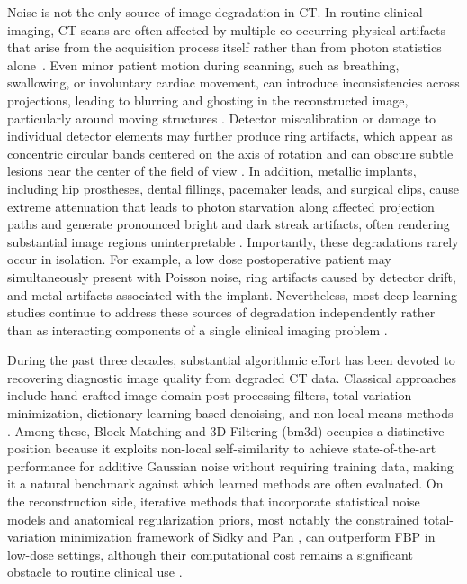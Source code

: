 Noise is not the only source of image degradation in CT. In routine clinical imaging, CT scans are often affected by multiple co-occurring physical artifacts that arise from the acquisition process itself rather than from photon statistics alone~\cite{Boas2012}. Even minor patient motion during scanning, such as breathing, swallowing, or involuntary cardiac movement, can introduce inconsistencies across projections, leading to blurring and ghosting in the reconstructed image, particularly around moving structures \cite{LuMackie2002, Lu2005}. Detector miscalibration or damage to individual detector elements may further produce ring artifacts, which appear as concentric circular bands centered on the axis of rotation and can obscure subtle lesions near the center of the field of view \cite{Sijbers2004, Prell2009}. In addition, metallic implants, including hip prostheses, dental fillings, pacemaker leads, and surgical clips, cause extreme attenuation that leads to photon starvation along affected projection paths and generate pronounced bright and dark streak artifacts, often rendering substantial image regions uninterpretable \cite{ZhangYu2018, Gjesteby2016}. Importantly, these degradations rarely occur in isolation. For example, a low dose postoperative patient may simultaneously present with Poisson noise, ring artifacts caused by detector drift, and metal artifacts associated with the implant. Nevertheless, most deep learning studies continue to address these sources of degradation independently rather than as interacting components of a single clinical imaging problem \cite{Liang2025}.

During the past three decades, substantial algorithmic effort has been devoted to recovering diagnostic image quality from degraded CT data. Classical approaches include hand-crafted image-domain post-processing filters, total variation minimization, dictionary-learning-based denoising, and non-local means methods \cite{Sadia2024, Tian2020}. Among these, Block-Matching and 3D Filtering (\gls{bm3d}) \cite{Dabov2007} occupies a distinctive position because it exploits non-local self-similarity to achieve state-of-the-art performance for additive Gaussian noise without requiring training data, making it a natural benchmark against which learned methods are often evaluated. On the reconstruction side, iterative methods that incorporate statistical noise models and anatomical regularization priors, most notably the constrained total-variation minimization framework of Sidky and Pan \cite{SidkyPan2008}, can outperform FBP in low-dose settings, although their computational cost remains a significant obstacle to routine clinical use \cite{Beister2012}.

